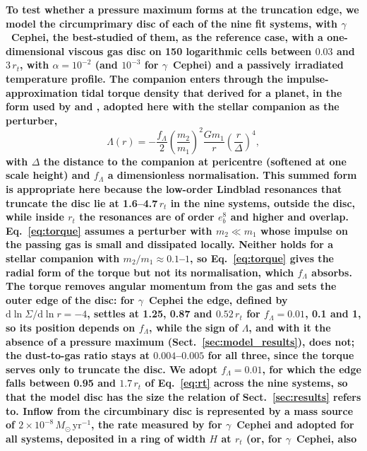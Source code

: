 \documentclass{aa}
\newcommand{\rev}[1]{{\color{red}\textbf{#1}}}
\begin{document}
\rev{To test whether a pressure maximum forms at the truncation edge, we
model the circumprimary disc of each of the nine fit systems, with
$\gamma$~Cephei, the best-studied of them, as the reference case, with a
one-dimensional viscous gas disc \citep[DustPy;][]{Stammler2022} on 150
logarithmic cells between $0.03$ and $3\,r_t$, with $\alpha = 10^{-2}$
(and $10^{-3}$ for $\gamma$~Cephei) and a passively irradiated
temperature profile. The companion enters through the impulse-approximation
tidal torque density that \citet{Lin1986c} derived for a planet, in the
form used by \citet{Trilling1998} and \citet{Armitage2002}, adopted here
with the stellar companion as the perturber,
\begin{equation}
\Lambda(r) = -\frac{f_\Lambda}{2}\left(\frac{m_2}{m_1}\right)^2\frac{G m_1}{r}\left(\frac{r}{\Delta}\right)^4,
\label{eq:torque}
\end{equation}
with $\Delta$ the distance to the companion at pericentre (softened at
one scale height) and $f_\Lambda$ a dimensionless normalisation. This
summed form is appropriate here because the low-order Lindblad
resonances that truncate the disc \citep{Artymowicz1994} lie at
1.6--4.7\,$r_t$ in the nine systems, outside the disc, while inside $r_t$
the resonances are of order $e_b^{8}$ and higher and overlap.
Eq.~\eqref{eq:torque} assumes a perturber with $m_2 \ll m_1$ whose
impulse on the passing gas is small and dissipated locally. Neither
holds for a stellar companion with $m_2/m_1 \approx 0.1$--$1$, so
Eq.~\eqref{eq:torque} gives the radial form of the torque but not its
normalisation, which $f_\Lambda$ absorbs. The torque removes angular
momentum from the gas and sets the outer edge of the disc: for
$\gamma$~Cephei the edge, defined by
$\mathrm{d}\ln\Sigma/\mathrm{d}\ln r = -4$, settles at 1.25, 0.87 and
$0.52\,r_t$ for $f_\Lambda = 0.01$, 0.1 and 1, so its position depends on $f_\Lambda$,
while the sign of $\Lambda$, and with it the absence of a pressure
maximum (Sect.~\ref{sec:model_results}), does not; the dust-to-gas
ratio stays at $0.004$--$0.005$ for all three, since the torque serves
only to truncate the disc. We adopt
$f_\Lambda = 0.01$, for which the edge falls between 0.95 and $1.7\,r_t$ of
Eq.~\eqref{eq:rt} across the nine systems, so that the model disc has
the size the relation of Sect.~\ref{sec:results} refers to. Inflow from the circumbinary
disc is represented by a mass source of
$2\times10^{-8}\,M_\odot\,\mathrm{yr}^{-1}$, the rate measured by
\citet{Marzari2025} for $\gamma$~Cephei and adopted for all systems,
deposited in a ring of width $H$ at $r_t$ (or, for $\gamma$~Cephei, also
}
\end{document}

